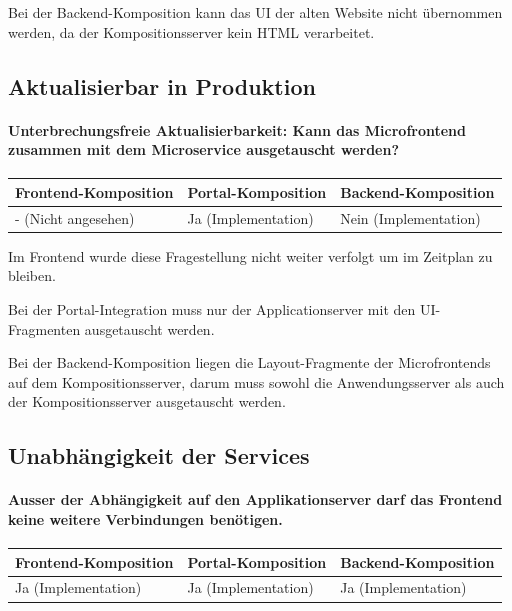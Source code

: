 Bei der Backend-Komposition kann das UI der alten Website nicht übernommen werden, da der Kompositionsserver kein \ac{HTML} verarbeitet.

\subsection{Aktualisierbar in Produktion}

\paragraph{Unterbrechungsfreie Aktualisierbarkeit: Kann das Microfrontend zusammen mit dem Microservice ausgetauscht werden?}

\begin{tabularx}{\linewidth}{| Y | Y | Y |}
    \hline
    Frontend-Komposition & Portal-Komposition & Backend-Komposition
    \\ \hline
    - (Nicht angesehen) & Ja (Implementation) & Nein (Implementation) \\ \hline
\end{tabularx}

Im Frontend wurde diese Fragestellung nicht weiter verfolgt um im Zeitplan zu bleiben. 

Bei der Portal-Integration muss nur der Applicationserver mit den UI-Fragmenten ausgetauscht werden.

Bei der Backend-Komposition liegen die Layout-Fragmente der Microfrontends auf dem Kompositionsserver, darum muss sowohl die Anwendungsserver als auch der Kompositionsserver ausgetauscht werden.

\subsection{Unabhängigkeit der Services}

\paragraph{Ausser der Abhängigkeit auf den Applikationserver darf das Frontend keine weitere Verbindungen benötigen.}

\begin{tabularx}{\linewidth}{| Y | Y | Y |}
    \hline
    Frontend-Komposition & Portal-Komposition & Backend-Komposition
    \\ \hline
    Ja (Implementation) & Ja (Implementation) & Ja (Implementation) 
    \\ \hline
\end{tabularx}

